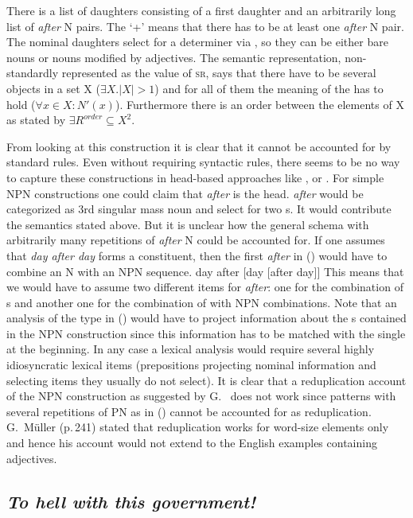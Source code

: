 \documentclass[output=paper]{langsci/langscibook}
\begin{document}
\z
There is a list of daughters consisting of a first daughter and an arbitrarily long list of
\emph{after} N pairs. The `+'\is{+} means that there has to be at least one \emph{after} N pair. The
nominal daughters select for a determiner via \spr, so they can be either bare nouns or nouns
modified by adjectives. The semantic representation, non-standardly represented as the value of
\textsc{sr}, says that there have to be several objects in a set X ($\exists X.|X| >1$) and for all of them the meaning
of the \nbar has to hold ($\forall x \in X:N'(x)$). Furthermore there is an order between the elements of X as stated by $\exists R^{order} \subseteq X^{2}$.

From looking at this construction it is clear that it cannot be accounted for by standard \xbar
rules. Even without requiring \xbar syntactic rules, there seems to be no way to capture these
constructions in head-based approaches like \minimalism, \cg or \dg. For simple NPN constructions
one could claim that \emph{after} is the head. \emph{after} would be categorized as 3rd singular
mass noun and select for two \nbar{}s. It would contribute the semantics stated above. But it is unclear how the general schema with arbitrarily
many repetitions of \emph{after} N could be accounted for. If one assumes that \emph{day after day}
forms a constituent, then the first \emph{after} in () would have to combine an N with an NPN sequence.
\ea
day after [day [after day]]
\z
This means that we would have to assume two different items for \emph{after}: one for the
combination of \nbar{}s and another one for the combination of \nbar with NPN combinations. Note
that an analysis of the type in () would have to project information about the \nbar{}s contained
in the NPN construction since this information has to be matched with the single \nbar at the
beginning. In any case a lexical analysis would require several highly idiosyncratic lexical items
(prepositions projecting nominal information and selecting items they usually do not select).
It is clear that a reduplication account of the NPN construction as suggested by
G.\ \citet{GMueller2011a} does not work since patterns with several repetitions of PN as in
() cannot be accounted for as reduplication. G.\ Müller (p.\,241) stated that reduplication works
for word-size elements only and hence his account would not extend to the English examples
containing adjectives.

\subsection{\emph{To hell with this government!}}
\end{document}
